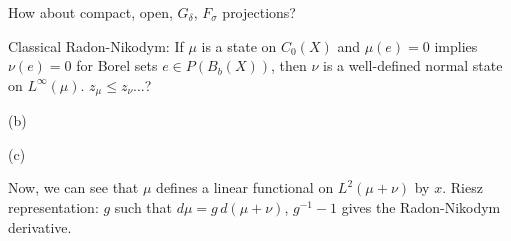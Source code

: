 \documentclass{../../large}
\begin{document}
\begin{prb}
\begin{parts}
\item How about compact, open, $G_\delta$, $F_\sigma$ projections?

\item Classical Radon-Nikodym: If $\mu$ is a state on $C_0(X)$ and $\mu(e)=0$ implies $\nu(e)=0$ for Borel sets $e\in P(B_b(X))$, then $\nu$ is a well-defined normal state on $L^\infty(\mu)$.
$z_\mu\le z_\nu$...?
\end{parts}
\end{prb}
\begin{pf}
(b)

(c)


Now, we can see that $\mu$ defines a linear functional on $L^2(\mu+\nu)$ by $x$.
Riesz representation: $g$ such that $d\mu=g\,d(\mu+\nu)$, $g^{-1}-1$ gives the Radon-Nikodym derivative.
\end{pf}
\end{document}
